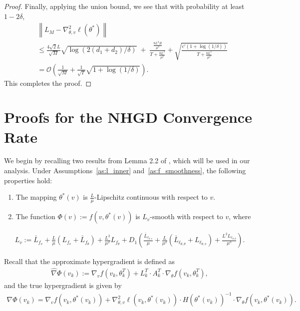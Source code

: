 \documentclass[11 pt]{article}
\begin{document}
\begin{proof}
Finally, applying the union bound, we see that with probability at least $1-2\delta$, 
\begin{align*}
        &\left\|L_M - \nabla_{\theta,v}^2\ell( \theta^*) \right\|\\
        & \leq \frac{4\sqrt{2}L}{\sqrt{M}}\sqrt{\log(2(d_1+d_2)/\delta)} \;+\; \frac{\frac{8L^2R}{\mu^2}}{T+\frac{8L^2}{\mu^2}}+\sqrt{\frac{c'(1+\log(1/\delta))}{T+\frac{8L^2}{\mu^2}}} \\
        &= \mathcal{O}(\frac{1}{\sqrt{M}}+\frac{1}{\sqrt{T}}\sqrt{1+\log(1/\delta)}).
\end{align*} 
This completes the proof.
\end{proof}


\newpage
\section{Proofs for the NHGD Convergence Rate}\label{app:outer}

We begin by recalling two results from Lemma 2.2 of \cite{ghadimi2018approximation}, which will be used in our analysis. Under Assumptions~\ref{as:l_inner} and~\ref{as:f_smoothness}, the following properties hold:

\begin{enumerate}
    \item  The mapping $\theta^*(v)$ is $\frac{L}{\mu}$-Lipschitz continuous with respect to $v$.
    \item The function $\Phi(v):=f(v,\theta^*(v))$ is $L_{v}$-smooth with respect to $v$, where 
\end{enumerate}
\begin{align}\label{eq:L_v}
        L_v:=\bar{L}_{f_v} + \frac{L}{\mu}\left(L_{f_v}+\bar{L}_{f_\theta} \right)+\frac{L^2}{\mu^2}L_{f_\theta}+D_1\left( \frac{\bar{L}_{\ell_{\theta,v}}}{\mu}+ \frac{L}{\mu^2}(\bar{L}_{\ell_{\theta,\theta}}+L_{\ell_{\theta,v}}) +\frac{L^2L_{\ell_{\theta,\theta}}}{\mu^3} \right).      
    \end{align}

Recall that the approximate hypergradient is defined as
\begin{align}\label{eq:apprx_f_v}
    \widehat{\nabla}\Phi(v_k) :=   \nabla_v f(v_k,\theta_k^T) + L_k^T\cdot A_k^T \cdot \nabla_{\theta}f(v_k,\theta_k^T),
\end{align}
and the true hypergradient is given by
\begin{align}\label{eq:f_v}
    \nabla \Phi(v_k) = \nabla_v f(v_k,\theta^*(v_k)) + \nabla_{\theta,v}^2\ell(v_k,\theta^*(v_k))\cdot H(\theta^*(v_k))^{-1} \cdot \nabla_{\theta}f(v_k,\theta^*(v_k)).
\end{align}
\end{document}
